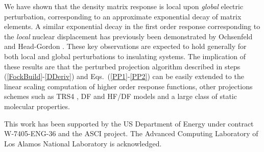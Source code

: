 \documentclass[prl,aps,preprint,showpacs,superbib]{revtex4}
\begin{document}

We have shown that the density matrix response is local upon {\em global} electric perturbation, 
corresponding to an approximate exponential decay of matrix elements. A similar exponential decay 
in the first order response corresponding to the {\em local} nuclear displacement has previously been
demonstrated by Ochsenfeld and Head-Gordon \cite{Ochsenfeld_1997}.   These key observations are expected to
hold generally for both local and global perturbations to insulating systems.  The implication of these 
results are that the perturbed projection algorithm described in steps (\ref{FockBuild}-\ref{DDeriv}) and
Eqs.~(\ref{PP1}-\ref{PP2}) can be easily extended to the linear scaling computation of higher order 
response functions, other projections schemes such as  TRS4 \cite{ANiklasson03},
DF and HF/DF models and a large class of static molecular properties.

This work has been supported by the US Department of Energy 
under contract W-7405-ENG-36 and the ASCI project.  
The Advanced Computing Laboratory of Los 
Alamos National Laboratory is acknowledged.


\end{document}
